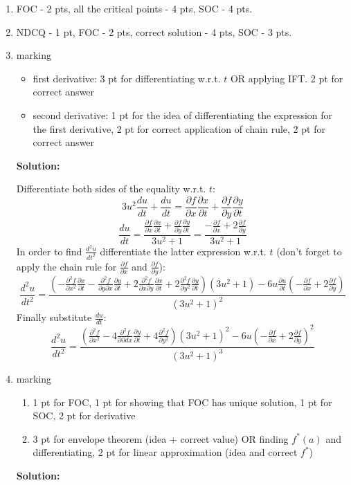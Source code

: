 \documentclass[12pt]{article} %
\theoremstyle{definition} %
\begin{document}
\begin{enumerate}
\item  FOC - 2 pts, all the critical points - 4 pts, SOC - 4 pts.
\item  NDCQ - 1 pt, FOC - 2 pts, correct solution - 4 pts, SOC - 3 pts.

\item marking
\begin{itemize}
\item first derivative: 3 pt for differentiating w.r.t. \(t\) OR applying IFT. 2 pt for correct answer
\item second derivative: 1 pt for the idea of differentiating the expression for the first derivative, 2 pt for correct application of chain rule, 2 pt for correct answer
\end{itemize}
\textbf{Solution:}

Differentiate both sides of the equality w.r.t. \(t\):
\[
3u^2 \frac{du}{dt} + \frac{du}{dt} = \frac{\partial f}{\partial x}\frac{\partial x}{\partial t}+\frac{\partial f}{\partial y}\frac{\partial y}{\partial t}
\]
\[
\frac{du}{dt} = \frac{\frac{\partial f}{\partial x}\frac{\partial x}{\partial t}+\frac{\partial f}{\partial y}\frac{\partial y}{\partial t}}{3u^2+1} = \frac{-\frac{\partial f}{\partial x}+2\frac{\partial f}{\partial y}}{3u^2+1}
\]
In order to find \(\frac{d^2u}{dt^2}\) differentiate the latter expression w.r.t.  \(t\) (don't forget to apply the chain rule for \(\frac{\partial f}{\partial x}\) and \(\frac{\partial f}{\partial y}\)):
\[
\frac{d^2u}{dt^2} = \frac{(-\frac{\partial ^2f}{\partial x^2}\frac{\partial x}{\partial t}-\frac{\partial ^2f}{\partial y\partial x}\frac{\partial y}{\partial t} + 2\frac{\partial ^2f}{\partial x\partial y}\frac{\partial x}{\partial t}+2\frac{\partial ^2f}{\partial y^2}\frac{\partial y}{\partial t})(3u^2+1) -
6u\frac{\partial u}{\partial t}(-\frac{\partial f}{\partial x}+2\frac{\partial f}{\partial y})}
{(3u^2+1)^2}
\]
Finally substitute \(\frac{du}{dt}\):
\[
\frac{d^2u}{dt^2} = \frac{(\frac{\partial ^2f}{\partial x^2}-4\frac{\partial ^2f}{\partial \partial dx}\frac{\partial y}{\partial t} + 4\frac{\partial ^2f}{\partial y^2})(3u^2+1)^2 -
6u(-\frac{\partial f}{\partial x}+2\frac{\partial f}{\partial y})^2}
{(3u^2+1)^3}
\]

\item marking
\begin{enumerate}
\item 1 pt for FOC, 1 pt for showing that FOC has unique solution, 1 pt for SOC, 2 pt for derivative
\item 3 pt for envelope theorem (idea + correct value) OR finding \(f^*(a)\) and differentiating, 2 pt for linear approximation (idea and correct \(f^*\))
\end{enumerate}
\textbf{Solution:}


\end{enumerate}
\end{document}
